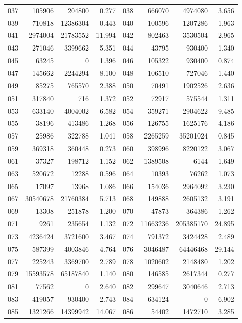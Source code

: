 \begin{longtable}{lrrr@{\hspace{16bp}}lrrr}
037 & 105906 & 204800 & 0.277 & 038 & 666070 & 4974080 & 3.656\\
039 & 710818 & 12386304 & 0.443 & 040 & 100596 & 1207286 & 1.963\\
041 & 2974004 & 21783552 & 11.994 & 042 & 802463 & 3530504 & 2.965\\
043 & 271046 & 3399662 & 5.351 & 044 & 43795 & 930400 & 1.340\\
045 & 63245 & 0 & 1.396 & 046 & 105322 & 930400 & 0.874\\
047 & 145662 & 2244294 & 8.100 & 048 & 106510 & 727046 & 1.440\\
049 & 85275 & 765570 & 2.388 & 050 & 70491 & 1902526 & 2.636\\
051 & 317840 & 716 & 1.372 & 052 & 72917 & 575544 & 1.311\\
053 & 633140 & 4004002 & 6.582 & 054 & 359271 & 2904622 & 9.485\\
055 & 38196 & 413486 & 1.268 & 056 & 126755 & 1625176 & 4.186\\
057 & 25986 & 322788 & 1.041 & 058 & 2265259 & 35201024 & 0.845\\
059 & 369318 & 360448 & 0.273 & 060 & 398996 & 8220122 & 3.067\\
061 & 37327 & 198712 & 1.152 & 062 & 1389508 & 6144 & 1.649\\
063 & 520672 & 12288 & 0.596 & 064 & 10393 & 76262 & 1.073\\
065 & 17097 & 13968 & 1.086 & 066 & 154036 & 2964092 & 3.230\\
067 & 30540678 & 21760384 & 5.713 & 068 & 149888 & 2605132 & 3.191\\
069 & 13308 & 251878 & 1.200 & 070 & 47873 & 364386 & 1.262\\
071 & 9261 & 235654 & 1.132 & 072 & 11663236 & 205385170 & 24.895\\
073 & 4236424 & 3721600 & 3.467 & 074 & 791372 & 3424428 & 2.489\\
075 & 587399 & 4003846 & 4.764 & 076 & 3046487 & 64446468 & 29.144\\
077 & 225243 & 3369700 & 2.789 & 078 & 1020602 & 2148480 & 1.202\\
079 & 15593578 & 65187840 & 1.140 & 080 & 146585 & 2617344 & 0.277\\
081 & 77562 & 0 & 2.640 & 082 & 299647 & 3040646 & 2.713\\
083 & 419057 & 930400 & 2.743 & 084 & 634124 & 0 & 6.902\\
085 & 1321266 & 14399942 & 14.067 & 086 & 54402 & 1472710 & 3.285\\

\end{longtable}
